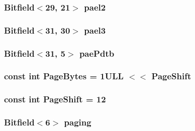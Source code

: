 \label{namespaceX86ISA_a541e3530d0b0f23502c18586337ee243}
\hypertarget{namespaceX86ISA_abc575d753d5773b80938c25879afea66}{
\subsubsection[{pael2}]{\setlength{\rightskip}{0pt plus 5cm}Bitfield$<$29, 21$>$ {\bf pael2}}}
\label{namespaceX86ISA_abc575d753d5773b80938c25879afea66}
\hypertarget{namespaceX86ISA_ac5906e9f191805a7e1bf75c616503363}{
\subsubsection[{pael3}]{\setlength{\rightskip}{0pt plus 5cm}Bitfield$<$31, 30$>$ {\bf pael3}}}
\label{namespaceX86ISA_ac5906e9f191805a7e1bf75c616503363}
\hypertarget{namespaceX86ISA_aa0dc6bf9434d254fe46675836df602fb}{
\subsubsection[{paePdtb}]{\setlength{\rightskip}{0pt plus 5cm}Bitfield$<$31, 5$>$ {\bf paePdtb}}}
\label{namespaceX86ISA_aa0dc6bf9434d254fe46675836df602fb}
\hypertarget{namespaceX86ISA_a7a804a2139c455999786dede70a4467b}{
\subsubsection[{PageBytes}]{\setlength{\rightskip}{0pt plus 5cm}const int {\bf PageBytes} = 1ULL $<$$<$ PageShift}}
\label{namespaceX86ISA_a7a804a2139c455999786dede70a4467b}
\hypertarget{namespaceX86ISA_a500ead3838797254da115aeeff14aaa5}{
\subsubsection[{PageShift}]{\setlength{\rightskip}{0pt plus 5cm}const int {\bf PageShift} = 12}}
\label{namespaceX86ISA_a500ead3838797254da115aeeff14aaa5}
\hypertarget{namespaceX86ISA_a42d5421edead2baa14d54eafe4947d7c}{
\subsubsection[{paging}]{\setlength{\rightskip}{0pt plus 5cm}Bitfield$<$6$>$ {\bf paging}}}
